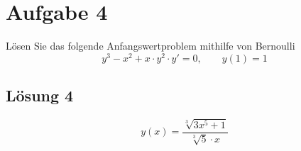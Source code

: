 \documentclass[main.tex]{subfiles}
\begin{document}
\section{Aufgabe 4}
Lösen Sie das folgende Anfangswertproblem mithilfe von Bernoulli
\[
    y^3 - x^2 + x \cdot y^2 \cdot y' = 0, \qquad y(1) = 1
\]

\subsection{Lösung 4}

$$
    y(x) = \frac{
        \sqrt[3]{3x^5 +1}
    }{
        \sqrt[3]{5}\cdot x
    }
$$
\end{document}
